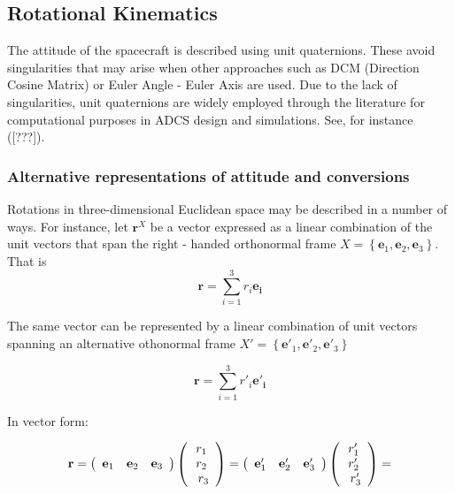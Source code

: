 \subsection{Rotational Kinematics}

The attitude of the spacecraft is described using unit quaternions. These avoid singularities that may arise when other approaches such as DCM (Direction Cosine Matrix) or Euler Angle - Euler Axis are used. Due to the lack of singularities, unit quaternions are widely employed through the literature for computational purposes in ADCS design and simulations. See, for instance ([???]).

\subsubsection{Alternative representations of attitude and conversions}
Rotations in three-dimensional Euclidean space may be described in a number of ways. For instance, let $\mathbf{r}^X$ be a vector expressed as a linear combination of the unit vectors that span the right - handed orthonormal frame $X = \left\{\mathbf{e}_1, \mathbf{e}_2, \mathbf{e}_3 \right\}$. That is
\begin{equation}
\mathbf{r} = \sum_{i=1}^{3}r_i \mathbf{e_i}
\end{equation}

The same vector can be represented by a linear combination of unit vectors spanning an alternative othonormal frame {$X' = \left\{\mathbf{e}'_1, \mathbf{e}'_2, \mathbf{e}'_3 \right\}$}

\begin{equation}
\mathbf{r} = \sum_{i=1}^{3}r'_i \mathbf{e'_i}
\end{equation}

In vector form:

\begin{equation}
	\mathbf{r} = \left(\begin{array} {c c c}\mathbf{e}_1 & \mathbf{e}_2 & \mathbf{e}_3 \end{array} \right) \left( \begin{array}{c} r_1\\ r_2\\\ r_3 \end{array}\right) =
	\left( \begin{array} {c c c}\mathbf{e}'_1 & \mathbf{e}'_2 & \mathbf{e}'_3 \end{array} \right) \left( \begin{array}{c} r'_1\\ r'_2\\\ r'_3 \end{array}\right) =
\end{equation}

